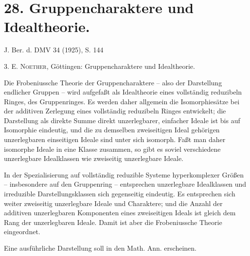 \section*{28. Gruppencharaktere und Idealtheorie.}

\begin{center}
J. Ber. d. DMV 34 (1925), S. 144
\end{center}

3. \textsc{E. Noether}, Göttingen: Gruppencharaktere und Idealtheorie.

Die Frobeniussche Theorie der Gruppencharaktere -- also der Darstellung endlicher Gruppen -- wird aufgefaßt als Idealtheorie eines vollständig reduzibeln Ringes, des Gruppenringes. Es werden daher allgemein die Isomorphiesätze bei der additiven Zerlegung eines vollständig reduzibeln Ringes entwickelt; die Darstellung als direkte Summe direkt unzerlegbarer, einfacher Ideale ist bis auf Isomorphie eindeutig, und die zu demselben zweiseitigen Ideal gehörigen unzerlegbaren einseitigen Ideale sind unter sich isomorph. Faßt man daher isomorphe Ideale in eine Klasse zusammen, so gibt es soviel verschiedene unzerlegbare Idealklassen wie zweiseitig unzerlegbare Ideale.

In der Spezialisierung auf vollständig reduzible Systeme hyperkomplexer Größen -- insbesondere auf den Gruppenring -- entsprechen unzerlegbare Idealklassen und irreduzible Darstellungsklassen sich gegenseitig eindeutig. Es entsprechen sich weiter zweiseitig unzerlegbare Ideale und Charaktere; und die Anzahl der additiven unzerlegbaren Komponenten eines zweiseitigen Ideals ist gleich dem Rang der unzerlegbaren Ideale. Damit ist aber die Frobeniussche Theorie eingeordnet.

Eine ausführliche Darstellung soll in den Math. Ann. erscheinen.

\clearpage
